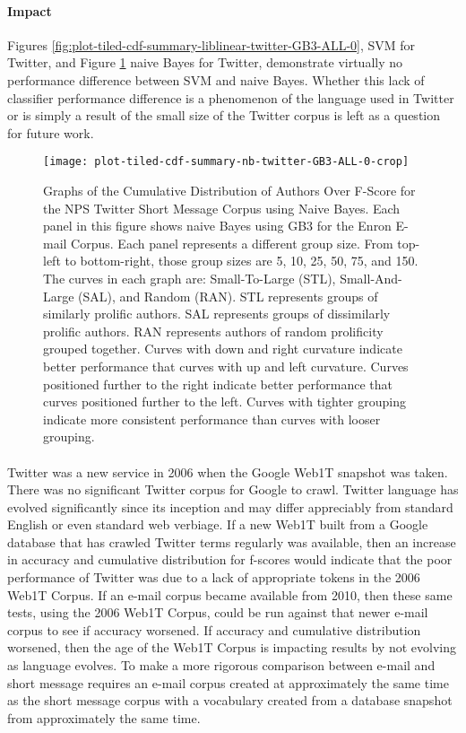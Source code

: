  \paragraph*{Impact}  Figures \ref{fig:plot-tiled-cdf-summary-liblinear-twitter-GB3-ALL-0}, SVM for Twitter, and Figure \ref{fig:plot-tiled-cdf-summary-nb-twitter-GB3-ALL-0} naive Bayes for Twitter, demonstrate virtually no performance difference between SVM and naive Bayes.  Whether this lack of classifier performance difference is a phenomenon of the language used in Twitter or is simply a result of the small size of the Twitter corpus is left as a question for future work.
	\begin{figure}[htbp!]
		\begin{center}
		\centering
		\texttt{[image: plot-tiled-cdf-summary-nb-twitter-GB3-ALL-0-crop]}
		\caption{Graphs of the Cumulative Distribution of Authors Over F-Score for the NPS Twitter Short Message Corpus using Naive Bayes. Each panel in this figure shows naive Bayes using GB3 for the Enron E-mail Corpus.  Each panel represents a different group size.  From top-left to bottom-right, those group sizes are 5, 10, 25, 50, 75, and 150. The curves in each graph are: Small-To-Large (STL), Small-And-Large (SAL), and Random (RAN).  STL represents groups of similarly prolific authors.  SAL represents groups of dissimilarly prolific authors.  RAN represents authors of random prolificity grouped together.  Curves with down and right curvature indicate better performance that curves with up and left curvature.  Curves positioned further to the right indicate better performance that curves positioned further to the left.  Curves with tighter grouping indicate more consistent performance than curves with looser grouping.}
		\label{fig:plot-tiled-cdf-summary-nb-twitter-GB3-ALL-0}
		\end{center}
	\end{figure}
	
		\paragraph*{} Twitter was a new service in 2006 when the Google Web1T snapshot was taken.  There was no significant Twitter corpus for Google to crawl.  Twitter language has evolved significantly since its inception and may differ appreciably from standard English or even standard web verbiage.  If a new Web1T built from a Google database that has crawled Twitter terms regularly was available, then an increase in accuracy and cumulative distribution for f-scores would indicate that the poor performance of Twitter was due to a lack of appropriate tokens in the 2006 Web1T Corpus.  If an e-mail corpus became available from 2010, then these same tests, using the 2006 Web1T Corpus, could be run against that newer e-mail corpus to see if accuracy worsened.  If accuracy and cumulative distribution worsened, then the age of the Web1T Corpus is impacting results by not evolving as language evolves.  To make a more rigorous comparison between e-mail and short message requires an e-mail corpus created at approximately the same time as the short message corpus with a vocabulary created from a database snapshot from approximately the same time.

